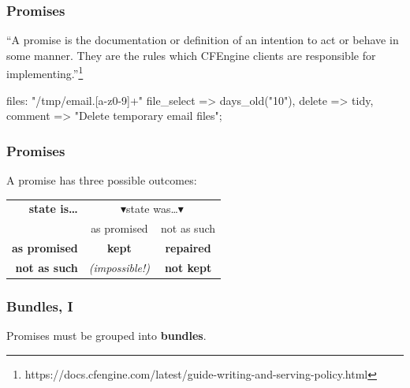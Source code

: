 \documentclass[english,serif,mathserif,usenames,dvipsnames]{beamer}
\begin{document}
\begin{frame}[fragile]
  \frametitle{Promises}
  ``A promise is the documentation or definition of an intention to
  act or behave in some manner. They are the rules which CFEngine
  clients are responsible for implementing.''\footnote{%
    https://docs.cfengine.com/latest/guide-writing-and-serving-policy.html
  }%

  \begin{semiverbatim}
files:
  \alert<2>{"/tmp/email.[a-z0-9]+"}
  \alert<3>{file_select   => days_old("10"),}
  \alert<4>{delete        => tidy,}
  comment       => "Delete temporary email files";
\end{semiverbatim}

\+
\end{frame}


\begin{frame}
  \frametitle{Promises}
  \begin{center}
    \newcommand\DN{$\blacktriangledown$}

    A promise has three possible outcomes:

    \+
    \begin{tabular}{>{\bf}rcc}
    {\bf state is\ldots}    & \multicolumn{2}{c}{\DN state was\ldots \DN} \\
    \multicolumn{1}{c}{\DN} & as promised  & not as such                  \\
    as promised             & {\color{green}\bf kept}
                                           & {\color{violet}\bf repaired} \\
    not as such             & {\color{gray}\em (impossible!)}
                                           & {\color{red}\bf not kept}    \\
    \end{tabular}
  \end{center}
\end{frame}


\begin{frame}[fragile]
  \frametitle{Bundles, I}

  Promises must be grouped into \textbf{bundles}.


\end{frame}
\end{document}

